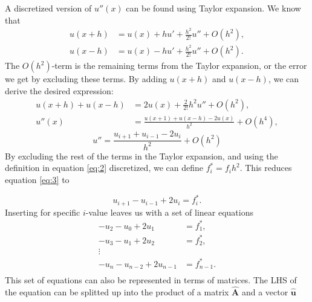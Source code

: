 \documentclass[a4paper,10pt]{article}
\begin{document}
A discretized version of $u''(x)$ can be found using Taylor expansion. We know that
\begin{align*}
u(x + h) &= u(x) + h u' + \frac{h^2}{2!} u'' + O(h^2), \\
u(x - h) &= u(x) - h u' + \frac{h^2}{2!} u'' + O(h^2). 
\end{align*} 
The $O(h^2)$-term is the remaining terms from the Taylor expansion, or the error we get by excluding these terms. By adding $u(x + h)$ and $u(x-h)$, we can derive the desired expression:
\begin{align*}
u(x + h) + u(x - h) &= 2 u(x) + \frac{2}{2!} h^2 u'' + O(h^2), \\
u''(x) &= \frac{u(x+1) + u(x-h) - 2u(x)}{h^2} + O(h^4),
\end{align*}
\begin{equation}\label{eq:3}
u'' =  \frac{u_{i+1} + u_{i-1} - 2u_i}{h^2}+ O(h^2)
\end{equation}
By excluding the rest of the terms in the Taylor expansion, and using the definition in equation \eqref{eq:2} discretized, we can define $f_i^* = f_i h^2 $. This reduces equation \eqref{eq:3} to

\begin{equation}\label{eq:4}
u_{i+1} - u_{i-1} + 2u_i = f_i^* .
\end{equation}
Inserting for specific $i$-value leaves us with a set of linear equations
\begin{align*}
-u_2 - u_0 + 2u_1 &= f_1^* , \\
-u_3 - u_1 + 2u_2 &= f_2^*,\\
\vdots \\
-u_n - u_{n-2} + 2u_{n-1} &= f_{n-1}^*. \\
\end{align*}
This set of equations can also be represented in terms of matrices. The LHS of the equation can be splitted up into the product of a matrix $\mathbf{\hat{A}}$ and a vector $\mathbf{\hat{u}}$
\end{document}
